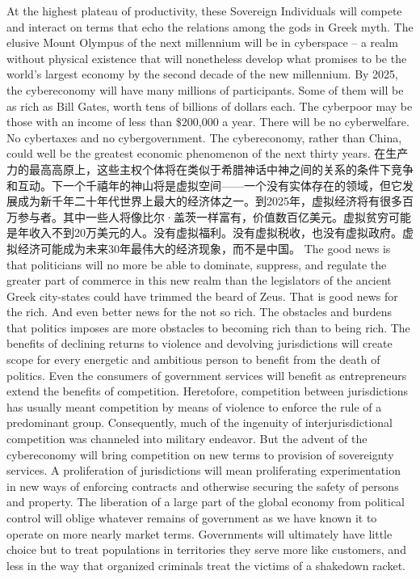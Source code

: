 \begin{paracol}{2}[]
\switchcolumn*
At the highest plateau of productivity, these Sovereign Individuals will compete and interact on terms that echo the relations among the gods in Greek myth. The elusive Mount Olympus of the next millennium will be in cyberspace -- a realm without physical existence that will nonetheless develop what promises to be the world's largest economy by the second decade of the new millennium. By 2025, the cybereconomy will have many millions of participants. Some of them will be as rich as Bill Gates, worth tens of billions of dollars each. The cyberpoor may be those with an income of less than \$200,000 a year. There will be no cyberwelfare. No cybertaxes and no cybergovernment. The cybereconomy, rather than China, could well be the greatest economic phenomenon of the next thirty years.
\switchcolumn
在生产力的最高高原上，这些主权个体将在类似于希腊神话中神之间的关系的条件下竞争和互动。下一个千禧年的神山将是虚拟空间——一个没有实体存在的领域，但它发展成为新千年二十年代世界上最大的经济体之一。到2025年，虚拟经济将有很多百万参与者。其中一些人将像比尔·盖茨一样富有，价值数百亿美元。虚拟贫穷可能是年收入不到20万美元的人。没有虚拟福利。没有虚拟税收，也没有虚拟政府。虚拟经济可能成为未来30年最伟大的经济现象，而不是中国。
\switchcolumn*
The good news is that politicians will no more be able to dominate, suppress, and regulate the greater part of commerce in this new realm than the legislators of the ancient Greek city-states could have trimmed the beard of Zeus. That is good news for the rich. And even better news for the not so rich. The obstacles and burdens that politics imposes are more obstacles to becoming rich than to being rich. The benefits of declining returns to violence and devolving jurisdictions will create scope for every energetic and ambitious person to benefit from the death of politics. Even the consumers of government services will benefit as entrepreneurs extend the benefits of competition. Heretofore, competition between jurisdictions has usually meant competition by means of violence to enforce the rule of a predominant group. Consequently, much of the ingenuity of interjurisdictional competition was channeled into military endeavor. But the advent of the cybereconomy will bring competition on new terms to provision of sovereignty services. A proliferation of jurisdictions will mean proliferating experimentation in new ways of enforcing contracts and otherwise securing the safety of persons and property. The liberation of a large part of the global economy from political control will oblige whatever remains of government as we have known it to operate on more nearly market terms. Governments will ultimately have little choice but to treat populations in territories they serve more like customers, and less in the way that organized criminals treat the victims of a shakedown racket.

\end{paracol}
